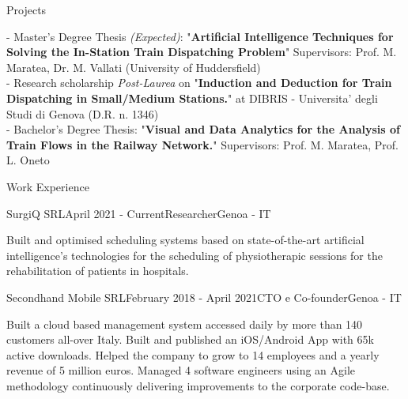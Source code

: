 \documentclass{resume} %
\begin{document}
\begin{rSection}{Projects}

- Master's Degree Thesis \textit{(Expected)}: "\textbf{Artificial Intelligence Techniques for Solving the In-Station Train Dispatching Problem}" Supervisors: Prof. M. Maratea, Dr. M. Vallati (University of Huddersfield)\\
- Research scholarship \textit{Post-Laurea} on "\textbf{Induction and Deduction for Train Dispatching in Small/Medium Stations.}" at DIBRIS - Universita' degli Studi di Genova (D.R. n. 1346) \\
- Bachelor's Degree Thesis: "\textbf{Visual and Data Analytics for the Analysis of Train Flows in the Railway Network.}" Supervisors: Prof. M. Maratea, Prof. L. Oneto
	
\end{rSection}


\begin{rSection}{Work Experience}


\begin{rSubsection}{SurgiQ SRL}{April 2021 - Current}{Researcher}{Genoa - IT}
\item Built and optimised scheduling systems based on state-of-the-art artificial intelligence's technologies for the scheduling of physiotherapic sessions for the rehabilitation of patients in hospitals.
\end{rSubsection}

\begin{rSubsection}{Secondhand Mobile SRL}{February 2018 - April 2021}{CTO e Co-founder}{Genoa - IT}
\item Built a cloud based management system accessed daily by more than 140 customers all-over Italy. Built and published an iOS/Android App with 65k active downloads. Helped the company to grow to 14 employees and a yearly revenue of 5 million euros. Managed 4 software engineers using an Agile methodology continuously delivering improvements to the corporate code-base.
\end{rSubsection}




\end{rSection}



\end{document}
